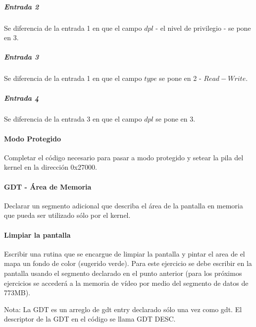 \subparagraph*{Entrada 2}

Se diferencia de la entrada 1 en que el campo $dpl$ - el nivel de privilegio - se pone en 3.

\subparagraph*{Entrada 3}

Se diferencia de la entrada 1 en que el campo $type$ se pone en 2 - $Read-Write$.

\subparagraph*{Entrada 4}

Se diferencia de la entrada 3 en que el campo $dpl$ se pone en 3.

\paragraph{Modo Protegido}\label{subsubsec:ej1-b}
Completar el código necesario para pasar a modo protegido y setear la pila del
kernel en la dirección 0x27000.
\hruler
{}

\paragraph{GDT - Área de Memoria}\label{subsubsec:ej1-c}
Declarar un segmento adicional que describa el área de la pantalla en memoria
que pueda ser utilizado sólo por el kernel.
\hruler
{}

\paragraph{Limpiar la pantalla}\label{subsubsec:ej1-d}
Escribir una rutina que se encargue de limpiar la pantalla y pintar el area de
el mapa un fondo de color (sugerido verde). Para este ejercicio se debe escribir
en la pantalla usando el segmento declarado en el punto anterior (para los
próximos ejercicios se accederá a la memoria de vídeo por medio del segmento de
datos de 773MB).

Nota: La GDT es un arreglo de gdt entry declarado sólo una vez como gdt. El
descriptor de la GDT en el código se llama GDT DESC.
\hruler
{}
